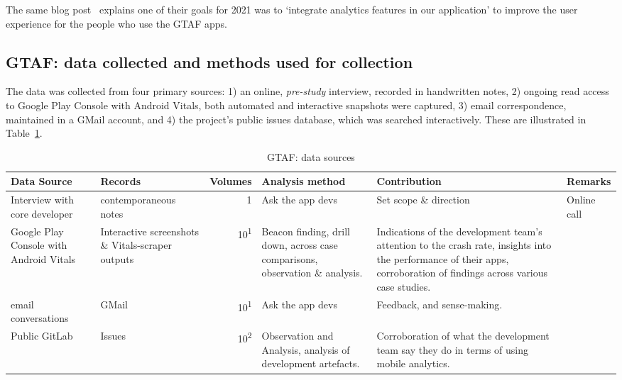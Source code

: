 The same blog post~\citep{gtafblog2021_gtaf_accomplishment_2020} explains one of their goals for 2021 was to `integrate analytics features in our application' to improve the user experience for the people who use the GTAF apps.

\subsection{GTAF: data collected and methods used for collection}
The data was collected from four primary sources: 1) an online, \textit{pre-study} interview, recorded in handwritten notes, 2) ongoing read access to Google Play Console with Android Vitals, both automated and interactive snapshots were captured, 3) email correspondence, maintained in a GMail account, and 4) the project's public issues database, which was searched interactively. These are illustrated in Table~\ref{tab:gtaf-data-sources}.


\begin{table}
    \centering
    \footnotesize
    \tabcolsep=0.12cm
    \begin{tabular}{p{2.4cm}p{2.4cm}rp{2.4cm}p{3cm}p{2.5cm}}
        Data Source & Records & Volumes & Analysis method &Contribution & Remarks \\
        \toprule
         Interview with core developer & contemporaneous notes\footnotemark & 1 & Ask the app devs & Set scope \& direction & Online call \\
         Google Play Console with Android Vitals &Interactive screenshots \& Vitals-scraper outputs &10\textsuperscript{1} & Beacon finding, drill down, across case comparisons, observation \& analysis. & Indications of the development team's attention to the crash rate, insights into the performance of their apps, corroboration of findings across various case studies. &  \\         
         email conversations & GMail & 10\textsuperscript{1} & Ask the app devs & Feedback, and sense-making.  &  \\
         Public GitLab & Issues  & 10\textsuperscript{2} & Observation and Analysis, analysis of development artefacts. & Corroboration of what the development team say they do in terms of using mobile analytics. &  \\

         \bottomrule
    \end{tabular}
    \caption{GTAF: data sources}
    \label{tab:gtaf-data-sources}
\end{table}



